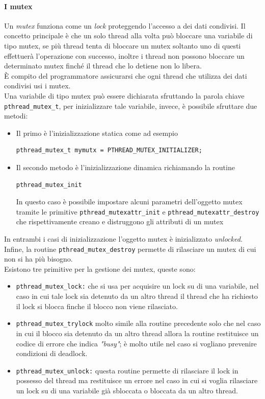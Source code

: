 \paragraph{I mutex}
Un \emph{mutex} funziona come un \emph{lock} proteggendo l'accesso a dei dati condivisi. Il concetto principale è che un solo thread alla volta può bloccare una variabile di tipo mutex, se più thread tenta di bloccare un mutex soltanto uno di questi effettuerà l'operazione con successo, inoltre i thread non possono bloccare un determinato mutex finché il thread che lo detiene non lo libera.\\
\uppercase{è} compito del programmatore assicurarsi che ogni thread che utilizza dei dati condivisi usi i mutex.\\
Una variabile di tipo mutex può essere dichiarata sfruttando la parola chiave \texttt{pthread\_mutex\_t}, per inizializzare tale variabile, invece, è possibile sfruttare due metodi:
\begin{itemize}
\item Il primo è l'inizializzazione statica come ad esempio
\begin{verbatim}
pthread_mutex_t mymutx = PTHREAD_MUTEX_INITIALIZER;
\end{verbatim}
\item Il secondo metodo è l'inizializzazione dinamica richiamando la routine
\begin{verbatim}
pthread_mutex_init
\end{verbatim}
In questo caso è possibile impostare alcuni parametri dell'oggetto mutex tramite le primitive \texttt{pthread\_mutexattr\_init} e \texttt{pthread\_mutexattr\_destroy} che rispettivamente creano e distruggono gli attributi  di un mutex
\end{itemize}
In entrambi i casi di inizializzazione l'oggetto mutex è inizializzato \emph{unlocked}. Infine, la routine \texttt{pthread\_mutex\_destroy} permette di rilasciare un mutex di cui non si ha più bisogno.\\
Esistono tre primitive per la gestione dei mutex, queste sono:
\begin{itemize}
\item \texttt{pthread\_mutex\_lock:} che si usa per acquisire un lock su di una variabile, nel caso in cui tale lock sia detenuto da un altro thread il thread che ha richiesto il lock si blocca finche il blocco non viene rilasciato.
\item \texttt{pthread\_mutex\_trylock} molto simile alla routine precedente solo che nel caso in cui il blocco sia detenuto da un altro thread allora la routine restituisce un codice di errore che indica \emph{"busy"}; è molto utile nel caso si vogliano prevenire condizioni di deadlock.
\item \texttt{pthread\_mutex\_unlock:} questa routine permette di rilasciare il lock in possesso del thread ma restituisce un errore nel caso in cui si voglia rilasciare un lock su di una variabile già sbloccata o bloccata da un altro thread.
\end{itemize}

